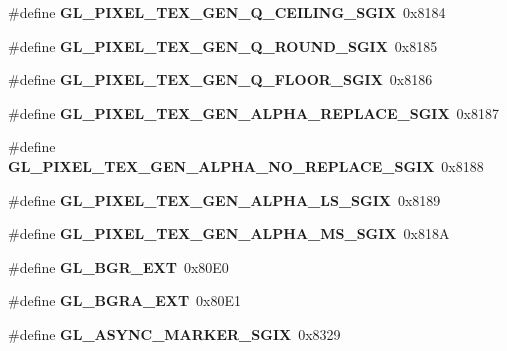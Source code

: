 \begin{DoxyCompactItemize}
\item 
\#define {\bfseries G\+L\+\_\+\+P\+I\+X\+E\+L\+\_\+\+T\+E\+X\+\_\+\+G\+E\+N\+\_\+\+Q\+\_\+\+C\+E\+I\+L\+I\+N\+G\+\_\+\+S\+G\+I\+X}~0x8184\label{_s_d_l__opengl_8h_ae106db239adefee1e984b1bc077ea4e3}

\item 
\#define {\bfseries G\+L\+\_\+\+P\+I\+X\+E\+L\+\_\+\+T\+E\+X\+\_\+\+G\+E\+N\+\_\+\+Q\+\_\+\+R\+O\+U\+N\+D\+\_\+\+S\+G\+I\+X}~0x8185\label{_s_d_l__opengl_8h_abfe203223e64be34d13ecd60ba6927dc}

\item 
\#define {\bfseries G\+L\+\_\+\+P\+I\+X\+E\+L\+\_\+\+T\+E\+X\+\_\+\+G\+E\+N\+\_\+\+Q\+\_\+\+F\+L\+O\+O\+R\+\_\+\+S\+G\+I\+X}~0x8186\label{_s_d_l__opengl_8h_a51bbb19084d5e32a1f2057ed7d44d4d3}

\item 
\#define {\bfseries G\+L\+\_\+\+P\+I\+X\+E\+L\+\_\+\+T\+E\+X\+\_\+\+G\+E\+N\+\_\+\+A\+L\+P\+H\+A\+\_\+\+R\+E\+P\+L\+A\+C\+E\+\_\+\+S\+G\+I\+X}~0x8187\label{_s_d_l__opengl_8h_a0c040f87dd4520e2280bfc3b044ec8e8}

\item 
\#define {\bfseries G\+L\+\_\+\+P\+I\+X\+E\+L\+\_\+\+T\+E\+X\+\_\+\+G\+E\+N\+\_\+\+A\+L\+P\+H\+A\+\_\+\+N\+O\+\_\+\+R\+E\+P\+L\+A\+C\+E\+\_\+\+S\+G\+I\+X}~0x8188\label{_s_d_l__opengl_8h_a38e672552a8516cf7fc12dcd3c1b945b}

\item 
\#define {\bfseries G\+L\+\_\+\+P\+I\+X\+E\+L\+\_\+\+T\+E\+X\+\_\+\+G\+E\+N\+\_\+\+A\+L\+P\+H\+A\+\_\+\+L\+S\+\_\+\+S\+G\+I\+X}~0x8189\label{_s_d_l__opengl_8h_ab0ea0d58de4c92c732374688ece97379}

\item 
\#define {\bfseries G\+L\+\_\+\+P\+I\+X\+E\+L\+\_\+\+T\+E\+X\+\_\+\+G\+E\+N\+\_\+\+A\+L\+P\+H\+A\+\_\+\+M\+S\+\_\+\+S\+G\+I\+X}~0x818\+A\label{_s_d_l__opengl_8h_afdf3d0bf7994f322ea161e8fb6eb632b}

\item 
\#define {\bfseries G\+L\+\_\+\+B\+G\+R\+\_\+\+E\+X\+T}~0x80\+E0\label{_s_d_l__opengl_8h_a32be6e62b1a51becc92406849a539734}

\item 
\#define {\bfseries G\+L\+\_\+\+B\+G\+R\+A\+\_\+\+E\+X\+T}~0x80\+E1\label{_s_d_l__opengl_8h_afbca5fa2e51fe8d9a1a33d2989cc5a9d}

\item 
\#define {\bfseries G\+L\+\_\+\+A\+S\+Y\+N\+C\+\_\+\+M\+A\+R\+K\+E\+R\+\_\+\+S\+G\+I\+X}~0x8329\label{_s_d_l__opengl_8h_a41a42602afc6f98a6a49be861ab4a464}


\end{DoxyCompactItemize}
